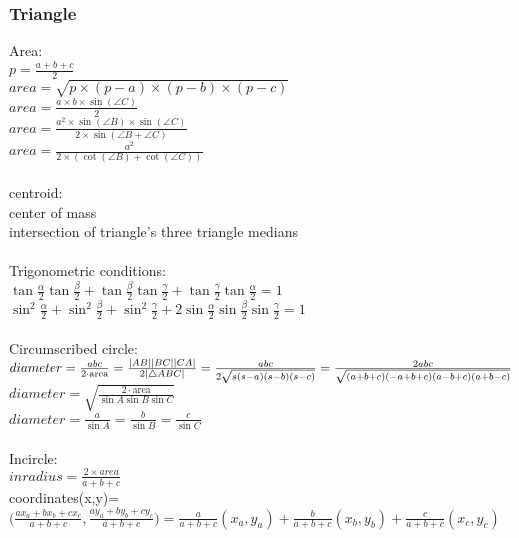 \subsubsection{Triangle}
Area:\\
$p=\frac{a+b+c}{2}$\\
$area=\sqrt{p\times (p-a)\times (p-b)\times (p-c)}$\\
$area=\frac{a\times b\times \sin(\angle C)}{2}$\\
$area=\frac{a^2\times \sin(\angle B)\times \sin(\angle C)}{2\times \sin(\angle B+\angle C)}$\\
$area=\frac{a^2}{2\times (\cot(\angle B)+\cot(\angle C))}$\\
\\
centroid:\\
    center of mass\\
    intersection of triangle's three triangle medians\\
\\
Trigonometric conditions:\\
$\tan{\frac{\alpha}{2}}\tan{\frac{\beta}{2}}+\tan{\frac{\beta}{2}}\tan{\frac{\gamma}{2}}+\tan{\frac{\gamma}{2}}\tan{\frac{\alpha}{2}}=1$\\
$\sin^2{\frac{\alpha}{2}}+\sin^2{\frac{\beta}{2}}+\sin^2{\frac{\gamma}{2}}+2\sin{\frac{\alpha}{2}}\sin{\frac{\beta}{2}}\sin{\frac{\gamma}{2}}=1$\\
\\
Circumscribed circle:\\
$diameter = \frac{abc}{2\cdot\text{area}} = \frac{|AB| |BC| |CA|}{2|\triangle ABC|} \\\\
         = \frac{abc}{2\sqrt{s(s-a)(s-b)(s-c)}}\\\\
         = \frac{2abc}{\sqrt{(a+b+c)(-a+b+c)(a-b+c)(a+b-c)}}$\\
$diameter=\sqrt{\frac{2 \cdot \text{area}}{\sin A \sin B \sin C}}$\\
$diameter=\frac{a}{\sin A}=\frac{b}{\sin B}=\frac{c}{\sin C}$\\
\\
Incircle:\\
$inradius=\frac{2\times area}{a+b+c}$\\
coordinates(x,y)=$\bigg(\frac{a x_a+b x_b+c x_c}{a+b+c},\frac{a y_a+b y_b+c y_c}{a+b+c}\bigg) = \frac{a}{a+b+c}(x_a,y_a)+\frac{b}{a+b+c}(x_b,y_b)+\frac{c}{a+b+c}(x_c,y_c)$\\
\\
